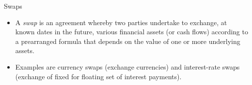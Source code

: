 {Swaps}
\begin{itemize}
\item<1->
A {\it swap} is an agreement whereby two parties
undertake to exchange, at known dates in the future, various
financial assets (or cash flows) according to a prearranged
formula that depends on the value of one or more underlying
assets.
\item<2->
Examples are currency swaps (exchange currencies) and
interest-rate swaps (exchange of fixed for floating set of
interest payments).
\end{itemize}


